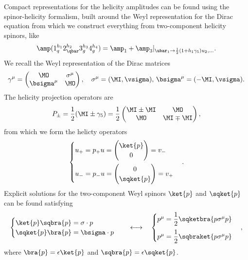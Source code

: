 Compact representations for the helicity amplitudes can be found using the spinor-helicity formalism, built around the Weyl representation for the Dirac equation from which we construct everything from two-component helicity spinors, like
\begin{equation}
    \amp(1_q^{h_1}2^{h_2}_{\qbar}3^{h_3}_g4^{h_4}_g) = \amp_1 + \amp_3|_{\ubar_1 \to \frac{1}{2}(1 + h_1\gamma_5)u_2 ,\dots}.
\end{equation}
We recall the Weyl representation of the Dirac matrices 
\begin{equation}
    \gamma^\mu = 
    \begin{pmatrix}
        \MO & \sigma^\mu \\
        \bsigma^\mu & \MO
    \end{pmatrix},\quad \sigma^\mu = (\MI,\vsigma),\,\bsigma^\mu = (-\MI,\vsigma).
\end{equation}
The helicity projection operators are
\begin{equation}
    P_\pm = \frac{1}{2}(\MI \pm \gamma_5) = \frac{1}{2}
    \begin{pmatrix}
        \MI \pm \MI & \MO \\
        \MO & \MI \mp \MI
    \end{pmatrix},
\end{equation}
from which we form the helicty operators
\begin{equation}
    \begin{cases}
        u_+ = p_+u = 
        \begin{pmatrix}
            \ket{p} \\
            0
        \end{pmatrix} = v_- \\[3ex]
        u_- = p_-u = 
        \begin{pmatrix}
            0 \\
            \sqket{p}
        \end{pmatrix} = v_+
    \end{cases}.
\end{equation}
Explicit solutions for the two-component Weyl spinors $\ket{p}$ and $\sqket{p}$ can be found satisfying 
\begin{align}
    \begin{cases}
        \ket{p}\sqbra{p} = \sigma \cdot p \\
        \sqket{p}\bra{p} = \bsigma \cdot p
    \end{cases}\quad\longleftrightarrow\quad
    \begin{cases}
        p^\mu = \dfrac{1}{2}\sqketbra{p\sigma^\mu p} \\[2ex]
        p^\mu = \dfrac{1}{2}\sqbraket{p\sigma^\mu p}
    \end{cases},
\end{align}
where $\bra{p} = \epsilon\ket{p}$ and $\sqbra{p} = \epsilon\sqket{p}$.


